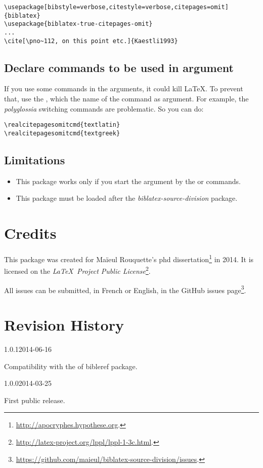 \documentclass{ltxdockit}[2011/03/25]
\begin{document}
\begin{verbatim}
\usepackage[bibstyle=verbose,citestyle=verbose,citepages=omit]{biblatex}
\usepackage{biblatex-true-citepages-omit}
...
\cite[\pno~112, on this point etc.]{Kaestli1993}
\end{verbatim}


\citereset
{}
\begin{quotation}
\cite[\pno~112, on this point etc.]{Kaestli1993}
\end{quotation}
\subsection{Declare commands to be used in  argument}

If you use some commands in the  arguments, it could kill \LaTeX. To prevent that, use the , which the name of the command as argument. For example, the \emph{polyglossia} switching commands are problematic. So you can do:
\begin{verbatim}
\realcitepagesomitcmd{textlatin}
\realcitepagesomitcmd{textgreek}
\end{verbatim}
\subsection{Limitations}

\begin{itemize}
	\item This package works only if you start the    argument by the  or  commands.
	\item This package must be loaded after the \emph{biblatex-source-division} package.
\end{itemize}
\section{Credits}

This package was created for Maïeul Rouquette's phd dissertation\footnote{\url{http://apocryphes.hypothese.org}.} in 2014. It is licensed on the \emph{\LaTeX\ Project Public License}\footnote{\url{http://latex-project.org/lppl/lppl-1-3c.html}.}. 


All issues can be submitted, in French or English, in the GitHub issues page\footnote{\url{https://github.com/maieul/biblatex-source-division/issues}.}.



\section{Revision History}
\begin{changelog}


\begin{release}{1.0.1}{2014-06-16}
\item Compatibility with the  of bibleref package.
\end{release}

\begin{release}{1.0.0}{2014-03-25}
\item First public release.
\end{release}

\end{changelog}
\end{document}
